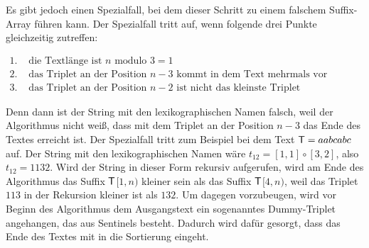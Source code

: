 Es gibt jedoch einen Spezialfall, bei dem dieser Schritt zu einem falschem Suffix-Array führen kann. Der Spezialfall tritt auf, wenn folgende drei Punkte gleichzeitig zutreffen:

$\begin{array}{ll}
1. & \text{ die Textlänge ist } n \text{ modulo } 3 = 1\\ 
2. & \text{ das Triplet an der Position } n - 3 \text{ kommt in dem Text mehrmals vor}\\ 
3. & \text{ das Triplet an der Position } n - 2 \text{ ist nicht das kleinste Triplet}
\end{array}$

Denn dann ist der String mit den lexikographischen Namen falsch, weil der Algorithmus nicht weiß, dass mit dem Triplet an der Position $n - 3$ das Ende des Textes erreicht ist.
Der Spezialfall tritt zum Beispiel bei dem Text $\inputtext = aabcabc$ auf. Der String mit den lexikographischen Namen wäre $t_{12} = [1, 1] \circ [3, 2]$, also $t_{12} = 1132$. Wird der String in dieser Form rekursiv aufgerufen, wird am Ende des Algorithmus das Suffix $\inputtext$$[1, n)$ kleiner sein als das Suffix $\inputtext$$[4, n)$, weil das Triplet $113$ in der Rekursion kleiner ist als $132$. Um dagegen vorzubeugen, wird vor Beginn des Algorithmus dem Ausgangstext ein sogenanntes Dummy-Triplet angehangen, das aus Sentinels besteht. Dadurch wird dafür gesorgt, dass das Ende des Textes mit in die Sortierung eingeht.